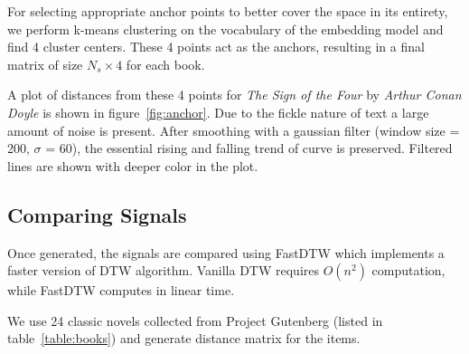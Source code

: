 \documentclass[%
 aip,
rsi,%
 amsmath,amssymb,
 reprint,%
author-year,
groupedaddress
]{revtex4-1}
\begin{document}
For selecting appropriate anchor points to better cover the space in its entirety, we perform k-means clustering on the vocabulary of the embedding model and find 4 cluster centers. These 4 points act as the anchors, resulting in a final matrix of size $N_{s} \times 4$ for each book.

A plot of distances from these 4 points for {\sl The Sign of the Four} by {\sl Arthur Conan Doyle} is shown in figure~\ref{fig:anchor}. Due to the fickle nature of text a large amount of noise is present. After smoothing with a gaussian filter (window size = 200, $\sigma$ = 60), the essential rising and falling trend of curve is preserved. Filtered lines are shown with deeper color in the plot.

\subsection{Comparing Signals}
Once generated, the signals are compared using FastDTW \citep{Salvador2004} which implements a faster version of DTW algorithm. Vanilla DTW requires $O(n^{2})$ computation, while FastDTW computes in linear time.

We use 24 classic novels collected from Project Gutenberg (listed in table~\ref{table:books}) and generate distance matrix for the items.
\end{document}
